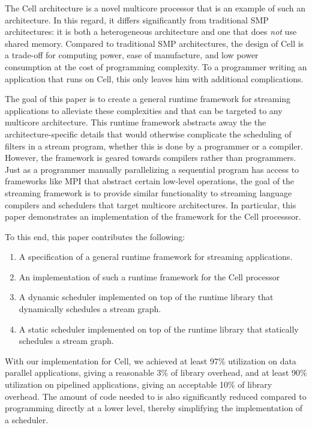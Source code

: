 The Cell architecture is a novel multicore processor that is an example of such an architecture. In this regard, it differs significantly from traditional SMP architectures: it is both a heterogeneous architecture and one that does \emph{not} use shared memory. Compared to traditional SMP architectures, the design of Cell is a trade-off for computing power, ease of manufacture, and low power consumption at the cost of programming complexity. To a programmer writing an application that runs on Cell, this only leaves him with additional complications.

The goal of this paper is to create a general runtime framework for streaming applications to alleviate these complexities and that can be targeted to any multicore architecture. This runtime framework abstracts away the the architecture-specific details that would otherwise complicate the scheduling of filters in a stream program, whether this is done by a programmer or a compiler. However, the framework is geared towards compilers rather than programmers. Just as a programmer manually parallelizing a sequential program has access to frameworks like MPI that abstract certain low-level operations, the goal of the streaming framework is to provide similar functionality to streaming language compilers and schedulers that target multicore architectures. In particular, this paper demonstrates an implementation of the framework for the Cell processsor.

To this end, this paper contributes the following:
\begin{enumerate}
\item A specification of a general runtime framework for streaming applications.
\item An implementation of such a runtime framework for the Cell processor
\item A dynamic scheduler implemented on top of the runtime library that dynamically schedules a stream graph.
\item A static scheduler implemented on top of the runtime library that statically schedules a stream graph.
\end{enumerate}

With our implementation for Cell, we achieved at least 97\% utilization on data parallel applications, giving a reasonable 3\% of library overhead, and at least 90\% utilization on pipelined applications, giving an acceptable 10\% of library overhead. The amount of code needed to is also significantly reduced compared to programming directly at a lower level, thereby simplifying the implementation of a scheduler.

